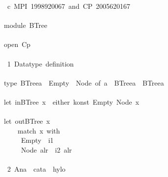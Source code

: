 \documentclass[a4paper]{article}
\begin{document}
\begin{tabbing}\ttfamily
~~c~MPI~1998920067~and~CP~2005620167\\
\ttfamily ~\\
\ttfamily ~module~BTree\\
\ttfamily ~\\
\ttfamily ~open~Cp\\
\ttfamily ~\\
\ttfamily ~~1~Datatype~definition~\\
\ttfamily ~\\
\ttfamily ~type~BTreea~~Empty~~Node~of~a~~BTreea~~BTreea\\
\ttfamily ~\\
\ttfamily ~let~inBTree~x~~either~konst~Empty~Node~x\\
\ttfamily ~\\
\ttfamily ~let~outBTree~x~\\
\ttfamily ~~~~~match~x~with\\
\ttfamily ~~~~~~Empty~~i1~\\
\ttfamily ~~~~~~Node~alr~~i2~alr\\
\ttfamily ~\\
\ttfamily ~~2~Ana~~cata~~hylo~\\

\end{tabbing}
\end{document}
